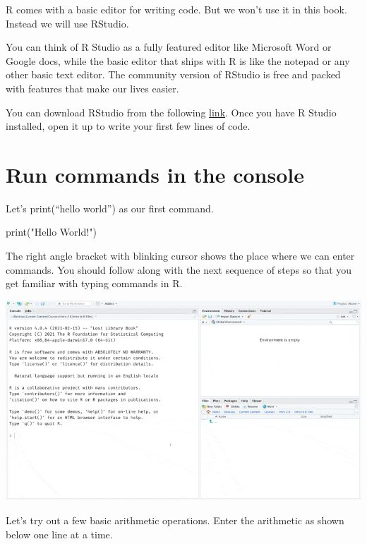\documentclass[
]{book}
\newenvironment{Shaded}{\begin{snugshade}}{\end{snugshade}}
\newcommand{\FunctionTok}[1]{\textcolor[rgb]{0.00,0.00,0.00}{#1}}
\newcommand{\NormalTok}[1]{#1}
\newcommand{\StringTok}[1]{\textcolor[rgb]{0.31,0.60,0.02}{#1}}
\begin{document}
R comes with a basic editor for writing code. But we won't use it in this book. Instead we will use RStudio.

You can think of R Studio as a fully featured editor like Microsoft Word or Google docs, while the basic editor that ships with R is like the notepad or any other basic text editor. The community version of RStudio is free and packed with features that make our lives easier.

You can download RStudio from the following \href{https://www.rstudio.com/products/rstudio/download/\#download}{link}. Once you have R Studio installed, open it up to write your first few lines of code.

\hypertarget{run-commands-in-the-console}{%
\section{Run commands in the console}\label{run-commands-in-the-console}}

Let's print(``hello world'') as our first command.

\begin{Shaded}
\begin{Highlighting}[]
\FunctionTok{print}\NormalTok{(}\StringTok{"Hello World!"}\NormalTok{)}
\end{Highlighting}
\end{Shaded}

The right angle bracket with blinking cursor shows the place where we can enter commands. You should follow along with the next sequence of steps so that you get familiar with typing commands in R.

\includegraphics{assets/ch_1-setup/gifs/hello_world.gif}

Let's try out a few basic arithmetic operations. Enter the arithmetic as shown below one line at a time.
\end{document}
